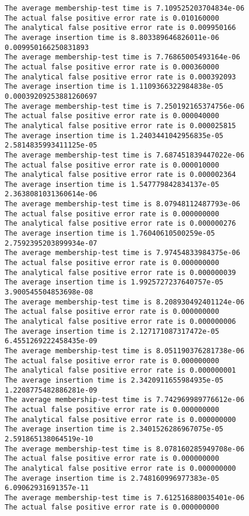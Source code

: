 \documentclass[11pt]{article}
\begin{document}
    \begin{Verbatim}[commandchars=\\\{\}]
The average membership-test time is 7.109525203704834e-06
The actual false positive error rate is 0.010160000
The analytical false positive error rate is 0.009950166
The average insertion time is 8.803389646826011e-06
0.009950166250831893
The average membership-test time is 7.76865005493164e-06
The actual false positive error rate is 0.000360000
The analytical false positive error rate is 0.000392093
The average insertion time is 1.1109366322984838e-05
0.00039209253881260697
The average membership-test time is 7.250192165374756e-06
The actual false positive error rate is 0.000040000
The analytical false positive error rate is 0.000025815
The average insertion time is 1.2403441042956835e-05
2.5814835993411125e-05
The average membership-test time is 7.687451839447022e-06
The actual false positive error rate is 0.000010000
The analytical false positive error rate is 0.000002364
The average insertion time is 1.547779842834137e-05
2.3638081031360614e-06
The average membership-test time is 8.07948112487793e-06
The actual false positive error rate is 0.000000000
The analytical false positive error rate is 0.000000276
The average insertion time is 1.76040610500259e-05
2.7592395203899934e-07
The average membership-test time is 7.97454833984375e-06
The actual false positive error rate is 0.000000000
The analytical false positive error rate is 0.000000039
The average insertion time is 1.9925727237640757e-05
3.900545504853698e-08
The average membership-test time is 8.208930492401124e-06
The actual false positive error rate is 0.000000000
The analytical false positive error rate is 0.000000006
The average insertion time is 2.127171087317472e-05
6.4551269222458435e-09
The average membership-test time is 8.051190376281738e-06
The actual false positive error rate is 0.000000000
The analytical false positive error rate is 0.000000001
The average insertion time is 2.3420911655984935e-05
1.2208775482886281e-09
The average membership-test time is 7.742969989776612e-06
The actual false positive error rate is 0.000000000
The analytical false positive error rate is 0.000000000
The average insertion time is 2.3401526286967075e-05
2.591865138064519e-10
The average membership-test time is 8.078160285949708e-06
The actual false positive error rate is 0.000000000
The analytical false positive error rate is 0.000000000
The average insertion time is 2.748160996977383e-05
6.09062931691357e-11
The average membership-test time is 7.612516880035401e-06
The actual false positive error rate is 0.000000000

\end{Verbatim}
\end{document}
